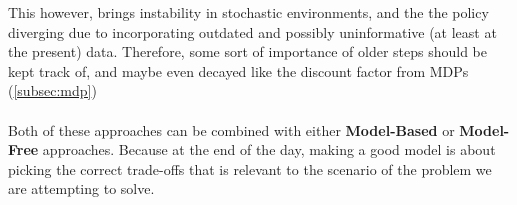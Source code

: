   This however, brings instability in stochastic environments, and the the policy diverging due to incorporating outdated and possibly uninformative (at least at the present) data. Therefore, some sort of importance of older steps should be kept track of, and maybe even decayed like the discount factor from MDPs (\ref{subsec:mdp}) 
  \\\\
  Both of these approaches can be combined with either \textbf{Model-Based} or \textbf{Model-Free} approaches. Because at the end of the day, making a good model is about picking the correct trade-offs that is relevant to the scenario of the problem we are attempting to solve.
